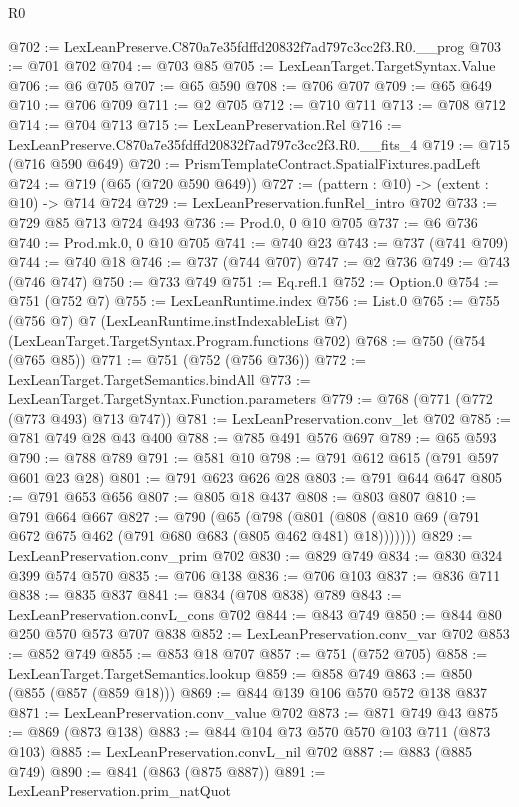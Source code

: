 \begin{lexlean}{R0}
\begin{coremodule}
@702 := LexLeanPreserve.C870a7e35fdffd20832f7ad797c3cc2f3.R0.__prog
@703 := @701 @702
@704 := @703 @85
@705 := LexLeanTarget.TargetSyntax.Value
@706 := @6 @705
@707 := @65 @590
@708 := @706 @707
@709 := @65 @649
@710 := @706 @709
@711 := @2 @705
@712 := @710 @711
@713 := @708 @712
@714 := @704 @713
@715 := LexLeanPreservation.Rel
@716 := LexLeanPreserve.C870a7e35fdffd20832f7ad797c3cc2f3.R0.__fits_4
@719 := @715 (@716 @590 @649)
@720 := PrismTemplateContract.SpatialFixtures.padLeft
@724 := @719 (@65 (@720 @590 @649))
@727 := (pattern : @10) -> (extent : @10) -> @714 @724
@729 := LexLeanPreservation.funRel_intro @702
@733 := @729 @85 @713 @724 @493
@736 := Prod.{0, 0} @10 @705
@737 := @6 @736
@740 := Prod.mk.{0, 0} @10 @705
@741 := @740 @23
@743 := @737 (@741 @709)
@744 := @740 @18
@746 := @737 (@744 @707)
@747 := @2 @736
@749 := @743 (@746 @747)
@750 := @733 @749
@751 := Eq.refl.{1}
@752 := Option.{0}
@754 := @751 (@752 @7)
@755 := LexLeanRuntime.index
@756 := List.{0}
@765 := @755
    (@756 @7)
    @7
    (LexLeanRuntime.instIndexableList @7)
    (LexLeanTarget.TargetSyntax.Program.functions @702)
@768 := @750 (@754 (@765 @85))
@771 := @751 (@752 (@756 @736))
@772 := LexLeanTarget.TargetSemantics.bindAll
@773 := LexLeanTarget.TargetSyntax.Function.parameters
@779 := @768 (@771 (@772 (@773 @493) @713 @747))
@781 := LexLeanPreservation.conv_let @702
@785 := @781 @749 @28 @43 @400
@788 := @785 @491 @576 @697
@789 := @65 @593
@790 := @788 @789
@791 := @581 @10
@798 := @791 @612 @615 (@791 @597 @601 @23 @28)
@801 := @791 @623 @626 @28
@803 := @791 @644 @647
@805 := @791 @653 @656
@807 := @805 @18 @437
@808 := @803 @807
@810 := @791 @664 @667
@827 := @790
    (@65
      (@798 (@801 (@808 (@810 @69 (@791 @672 @675 @462 (@791 @680 @683 (@805 @462 @481) @18)))))))
@829 := LexLeanPreservation.conv_prim @702
@830 := @829 @749
@834 := @830 @324 @399 @574 @570
@835 := @706 @138
@836 := @706 @103
@837 := @836 @711
@838 := @835 @837
@841 := @834 (@708 @838) @789
@843 := LexLeanPreservation.convL_cons @702
@844 := @843 @749
@850 := @844 @80 @250 @570 @573 @707 @838
@852 := LexLeanPreservation.conv_var @702
@853 := @852 @749
@855 := @853 @18 @707
@857 := @751 (@752 @705)
@858 := LexLeanTarget.TargetSemantics.lookup
@859 := @858 @749
@863 := @850 (@855 (@857 (@859 @18)))
@869 := @844 @139 @106 @570 @572 @138 @837
@871 := LexLeanPreservation.conv_value @702
@873 := @871 @749 @43
@875 := @869 (@873 @138)
@883 := @844 @104 @73 @570 @570 @103 @711 (@873 @103)
@885 := LexLeanPreservation.convL_nil @702
@887 := @883 (@885 @749)
@890 := @841 (@863 (@875 @887))
@891 := LexLeanPreservation.prim_natQuot

\end{coremodule}
\end{lexlean}
